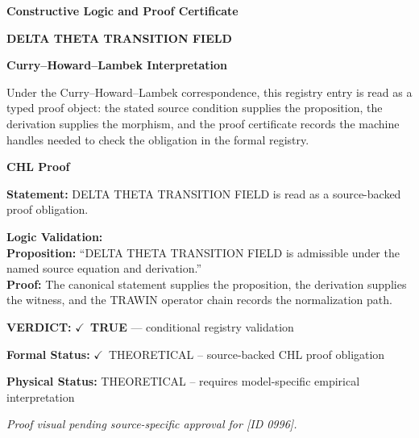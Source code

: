 \clearpage
\begingroup\tzpsupportsetup
\noindent\textbf{\fontsize{10.8pt}{12.8pt}\selectfont [ID 0996] Constructive Logic and Proof Certificate}\par
\noindent\textbf{\fontsize{10pt}{12pt}\selectfont DELTA THETA TRANSITION FIELD}\par
\vspace{0.45em}
\begingroup
\footnotesize
\setlength{\parskip}{0.22em}
\setlength{\parindent}{0pt}
\noindent\textbf{Curry--Howard--Lambek Interpretation}\par
Under the Curry--Howard--Lambek correspondence, this registry entry is read as a typed proof
object: the stated source condition supplies the proposition, the derivation supplies the
morphism, and the proof certificate records the machine handles needed to check the obligation
in the formal registry.

\vspace{0.45em}
\noindent\textbf{CHL Proof}\par
\textbf{Statement:} DELTA THETA TRANSITION FIELD is read as a source-backed proof obligation.

\textbf{Logic Validation:}\\
\textbf{Proposition:} ``DELTA THETA TRANSITION FIELD is admissible under the named source equation and derivation.''\\
\textbf{Proof:} The canonical statement supplies the proposition, the derivation supplies the witness, and the TRAWIN operator chain records the normalization path.

\textbf{VERDICT:} \ensuremath{\checkmark}\ \textbf{TRUE} --- conditional registry validation

\textbf{Formal Status:} \ensuremath{\checkmark}\ THEORETICAL -- source-backed CHL proof obligation

\textbf{Physical Status:} THEORETICAL -- requires model-specific empirical interpretation
\par\vspace{0.45em}
\par
\vfill
\begingroup\footnotesize\itshape
Proof visual pending source-specific approval for [ID 0996].
\par\endgroup
\vfill
\endgroup
\endgroup
